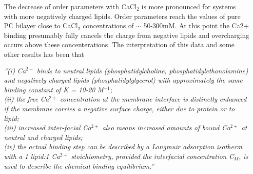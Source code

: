 \documentclass[aps,prl,superscriptaddress,twocolumn]{revtex4}
\begin{document}
The decrease of order parameters with CaCl$_2$
is more pronounced for systems with more
negatively charged lipids.%
Order parameters reach the values of pure PC bilayer close to CaCl$_2$ concentrations of $\sim$ 50-300mM.
At this point the Ca2+ binding presumably fully cancels the charge from negative lipids and
overcharging occurs above these concenterations.
The interpretation of this data and some other results has been that \cite{seelig90}
\begin{displayquote}
  {\it ''(i) Ca$^{2+}$ binds to neutral lipids (phosphatidylcholine, phosphatidylethanolamine) and negatively charged lipids
    (phosphatidylglycerol) with approximately the same binding constant of K = 10-20 M$^{-1}$; \\
    (ii) the free Ca$^{2+}$
    concentration at the membrane interface is distinctly enhanced if the membrane carries a negative surface
    charge, either due to protein or to lipid; \\
    (iii) increased inter-facial Ca$^{2+}$ also means increased amounts
    of bound Ca$^{2+}$ at neutral and charged lipids; \\
    (iv) the actual binding step can be described by a Langmuir
    adsorption isotherm with a 1 lipid:1 Ca$^{2+}$ stoichiometry, provided the interfacial concentration C$_M$, is
    used to describe the chemical binding equilibrium.''}
\end{displayquote}




\end{document}
